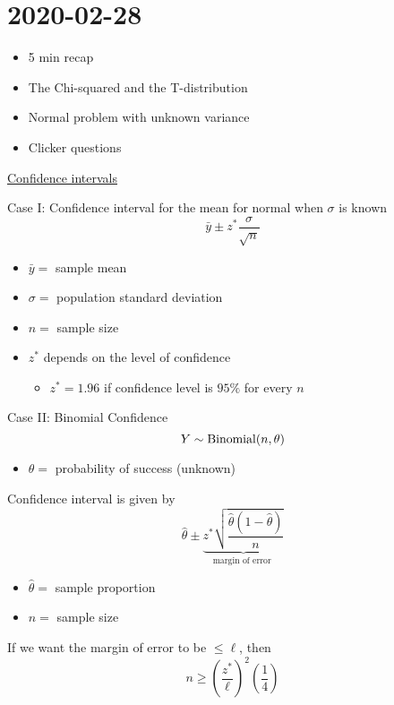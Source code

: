 \section{2020-02-28}
\begin{itemize}
    \item 5 min recap
    \item The Chi-squared and the T-distribution
    \item Normal problem with unknown variance
    \item Clicker questions
\end{itemize}
\underline{Confidence intervals}

Case I\@: Confidence interval for the mean for normal when $ \sigma $ is known
\[ \bar{y}\pm z^* \frac{\sigma}{\sqrt{n}}  \]
\begin{itemize}
    \item $ \bar{y}= $ sample mean
    \item $ \sigma= $ population standard deviation
    \item $ n= $ sample size
    \item $ z^* $ depends on the level of confidence
          \begin{itemize}
              \item $ z^*=1.96 $ if confidence level is $ 95\% $ for every $ n $
          \end{itemize}
\end{itemize}

Case II\@: Binomial Confidence
\[ Y \sim \operatorname{Binomial}(n,\theta) \]
\begin{itemize}
    \item $ \theta= $ probability of success (unknown)
\end{itemize}
Confidence interval is given by
\[ \hat{\theta}\pm \underbrace{z^* \sqrt{\frac{\hat{\theta}\left( 1-\hat{\theta} \right)}{n}}}_{\text{
            margin of error
        }} \]
\begin{itemize}
    \item $ \hat{\theta}= $ sample proportion
    \item $ n= $ sample size
\end{itemize}
If we want the margin of error to be $ \leqslant \ell $, then
\[ n\geqslant \left( \frac{z^*}{\ell} \right)^2\left( \frac{1}{4} \right) \]

